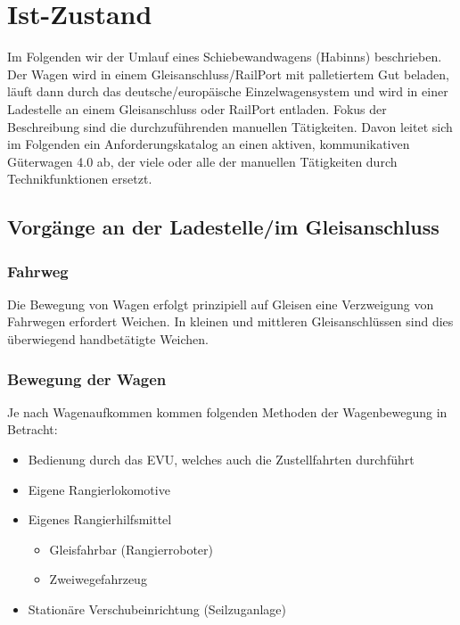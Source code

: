 \section{Ist-Zustand} %
Im Folgenden wir der Umlauf eines Schiebewandwagens (Habinns) beschrieben. Der Wagen wird in einem Gleisanschluss/RailPort mit palletiertem Gut beladen, läuft dann durch das deutsche/europäische Einzelwagensystem und wird in einer Ladestelle an einem Gleisanschluss oder RailPort entladen. Fokus der Beschreibung sind die durchzuführenden manuellen Tätigkeiten. Davon leitet sich im Folgenden ein Anforderungskatalog an einen aktiven, kommunikativen Güterwagen 4.0 ab, der viele oder alle der manuellen Tätigkeiten durch Technikfunktionen ersetzt.

\subsection{Vorgänge an der Ladestelle/im Gleisanschluss}
\subsubsection{Fahrweg}
Die Bewegung von Wagen erfolgt prinzipiell auf Gleisen eine Verzweigung von Fahrwegen erfordert Weichen. In kleinen und mittleren Gleisanschlüssen sind dies überwiegend handbetätigte Weichen. 
\subsubsection{Bewegung der Wagen}
Je nach Wagenaufkommen kommen folgenden Methoden der Wagenbewegung in Betracht:
\begin{itemize}
	\item Bedienung durch das EVU, welches auch die Zustellfahrten durchführt
	\item Eigene Rangierlokomotive
	\item Eigenes Rangierhilfsmittel
	\begin{itemize}
	    \item Gleisfahrbar (Rangierroboter)
	    \item Zweiwegefahrzeug
	\end{itemize}
	\item Stationäre Verschubeinrichtung (Seilzuganlage)
\end{itemize}
